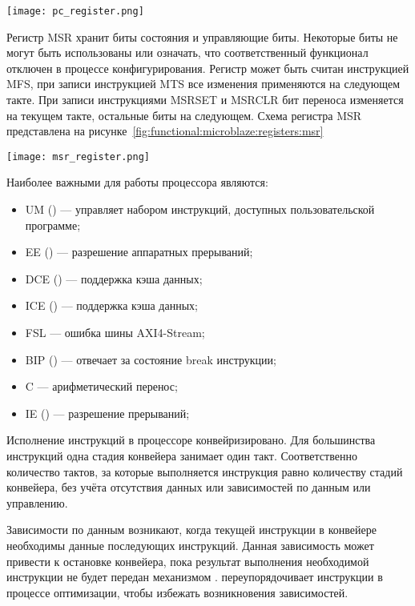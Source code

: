 \begin{center}
  \centering
  \texttt{[image: pc\_register.png]}
  \label{fig:functional:microblaze:registers:pc}
\end{center}

Регистр MSR хранит биты состояния и управляющие биты. Некоторые биты не могут быть использованы
или означать, что соответственный функционал отключен в процессе конфигурирования. Регистр может
быть считан инструкцией MFS, при записи инструкцией MTS все изменения применяются на следующем такте.
При записи инструкциями MSRSET и MSRCLR бит переноса изменяется на текущем такте, остальные биты
на следующем. Схема регистра MSR представлена на рисунке~\ref{fig:functional:microblaze:registers:msr}

\begin{center}
  \centering
  \texttt{[image: msr\_register.png]}
  \label{fig:functional:microblaze:registers:msr}
\end{center}

Наиболее важными для работы процессора являются:
\begin{itemize}
  \item UM () --- управляет набором инструкций, доступных пользовательской программе;
  \item EE () --- разрешение аппаратных прерываний;
  \item DCE () --- поддержка кэша данных;
  \item ICE () --- поддержка кэша данных;
  \item FSL --- ошибка шины AXI4-Stream;
  \item BIP () --- отвечает за состояние break инструкции;
  \item C  --- арифметический перенос;
  \item IE ()  --- разрешение прерываний;
\end{itemize}

Исполнение инструкций в процессоре конвейризировано. Для большинства инструкций одна стадия
конвейера занимает один такт. Соответственно количество тактов, за которые выполняется инструкция
равно количеству стадий конвейера, без учёта отсутствия данных или зависимостей по данным или управлению.

Зависимости по данным возникают, когда текущей инструкции в конвейере необходимы данные последующих инструкций.
Данная зависимость может привести к остановке конвейера, пока результат выполнения необходимой инструкции
не будет передан механизмом .  переупорядочивает инструкции в процессе
оптимизации, чтобы избежать возникновения зависимостей.

